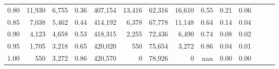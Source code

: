 \begin{tabular}{rrrrrrrrrrrrrr}
0.80 &  11,930 &  6,755 &  0.36 &  407,154 &   13,416 &  62,316 &  16,610 &  0.55 &  0.21 &      0.06 \\
0.85 &   7,038 &  5,462 &  0.44 &  414,192 &    6,378 &  67,778 &  11,148 &  0.64 &  0.14 &      0.04 \\
0.90 &   4,123 &  4,658 &  0.53 &  418,315 &    2,255 &  72,436 &   6,490 &  0.74 &  0.08 &      0.02 \\
0.95 &   1,705 &  3,218 &  0.65 &  420,020 &      550 &  75,654 &   3,272 &  0.86 &  0.04 &      0.01 \\
1.00 &     550 &  3,272 &  0.86 &  420,570 &        0 &  78,926 &       0 &   nan &  0.00 &      0.00 \\
\bottomrule
\end{tabular}
